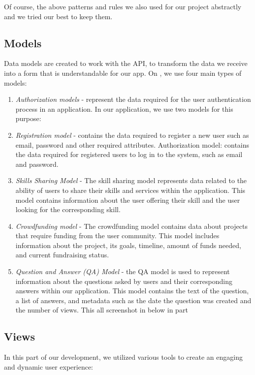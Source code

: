 Of course, the above patterns and rules we also used for our project abstractly and we tried our best to keep them.

\newpage
\subsection{Models}\label{modls}
Data models are created to work with the API, to transform the data we receive into a form that is understandable for our app. On , we use four main types of models:
\begin{enumerate}
    \item \textit{Authorization models} - represent the data required for the user authentication process in an application. In our application, we use two models for this purpose: 
    \item \textit{Registration model} - contains the data required to register a new user such as email, password and other required attributes. Authorization model: contains the data required for registered users to log in to the system, such as email and password.
    \item \textit{Skills Sharing Model} -  The skill sharing model represents data related to the ability of users to share their skills and services within the application. This model contains information about the user offering their skill and the user looking for the corresponding skill.
    \item \textit{Crowdfunding model} - The crowdfunding model contains data about projects that require funding from the user community. This model includes information about the project, its goals, timeline, amount of funds needed, and current fundraising status.
    \item \textit{Question and Answer (QA) Model} - the QA model is used to represent information about the questions asked by users and their corresponding answers within our application. This model contains the text of the question, a list of answers, and metadata such as the date the question was created and the number of views. This all screenshot in below in  part
\end{enumerate}

\subsection{Views}\label{views}
In this part of our development, we utilized various  tools to create an engaging and dynamic user experience:

